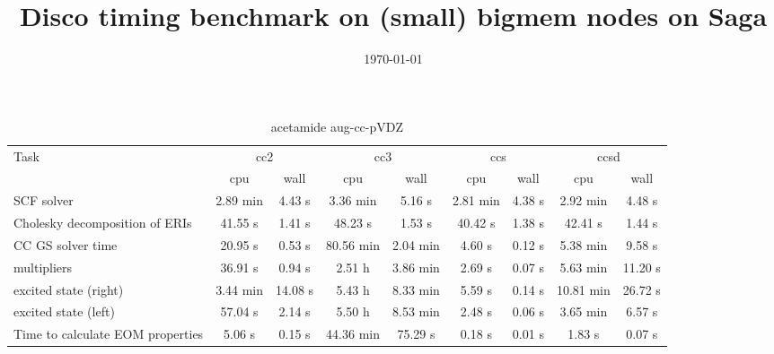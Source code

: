 \documentclass{article}
\title{Disco timing benchmark on (small) bigmem nodes on Saga}
\date{\today}
\begin{document}
\maketitle
\begin{table}
\caption{acetamide aug-cc-pVDZ}
\begin{tabular}{lcccccccc}
\toprule
Task & \multicolumn{2}{c}{cc2} & \multicolumn{2}{c}{cc3} & \multicolumn{2}{c}{ccs} & \multicolumn{2}{c}{ccsd}\\
\cmidrule(lr){2-3}\cmidrule(lr){4-5}\cmidrule(lr){6-7}\cmidrule(lr){8-9}
 & cpu & wall & cpu & wall & cpu & wall & cpu & wall\\
\midrule
SCF solver & 2.89 min & 4.43 s & 3.36 min & 5.16 s & 2.81 min & 4.38 s & 2.92 min & 4.48 s\\
Cholesky decomposition of ERIs & 41.55 s & 1.41 s & 48.23 s & 1.53 s & 40.42 s & 1.38 s & 42.41 s & 1.44 s\\
CC GS solver time & 20.95 s & 0.53 s & 80.56 min & 2.04 min & 4.60 s & 0.12 s & 5.38 min & 9.58 s\\
multipliers & 36.91 s & 0.94 s & 2.51 h & 3.86 min & 2.69 s & 0.07 s & 5.63 min & 11.20 s\\
excited state (right) & 3.44 min & 14.08 s & 5.43 h & 8.33 min & 5.59 s & 0.14 s & 10.81 min & 26.72 s\\
excited state (left) & 57.04 s & 2.14 s & 5.50 h & 8.53 min & 2.48 s & 0.06 s & 3.65 min & 6.57 s\\
Time to calculate EOM properties & 5.06 s & 0.15 s & 44.36 min & 75.29 s & 0.18 s & 0.01 s & 1.83 s & 0.07 s\\
\bottomrule
\end{tabular}
\end{table}
\end{document}
